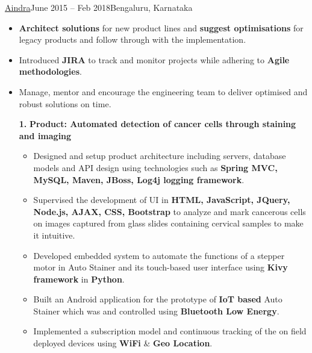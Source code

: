 \documentclass[10pt,a4paper,ragged2e,withhyper]{altacv}
\begin{document}
\begin{paracol}{2}
\divider


{\href{https://www.aindra.in/}{Aindra}}{June 2015 – Feb 2018}{Bengaluru, Karnataka}
\begin{itemize}
\item \textbf{Architect solutions} for new product lines and \textbf{suggest optimisations} for legacy products and follow through with the implementation.
\item Introduced \textbf{JIRA} to track and monitor projects while adhering to \textbf{Agile methodologies}.
\item Manage, mentor and encourage the engineering team to deliver optimised and robust solutions on time.
\vspace{6pt}
\newpage


\item[\textbf{1.}] \textbf{Product: Automated detection of cancer cells through staining and imaging}

\begin{itemize}
\item Designed and setup product architecture including servers, database models and API design using technologies such as \textbf{Spring MVC, MySQL, Maven, JBoss, Log4j logging framework}.
\item Supervised the development of UI in \textbf{HTML, JavaScript, JQuery, Node.js, AJAX, CSS, Bootstrap} to analyze and mark cancerous cells on images captured from glass slides containing cervical samples to make it intuitive.
\item Developed embedded system to automate the functions of a stepper motor in Auto Stainer and its touch-based user interface using \textbf{Kivy framework} in \textbf{Python}.
\item Built an Android application for the prototype of \textbf{IoT based} Auto Stainer which was  and controlled using \textbf{Bluetooth Low Energy}.
\item Implemented a subscription model and continuous tracking of the on field deployed devices using \textbf{WiFi} \& \textbf{Geo Location}.


\end{itemize}
\end{itemize}
\end{paracol}
\end{document}
